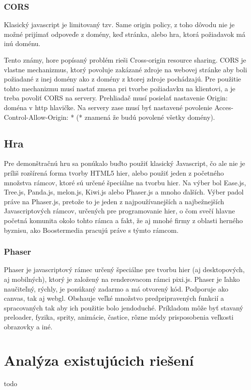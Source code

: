 \subsection{CORS}
\label{sec:cors}
Klasický javascript je limitovaný tzv. Same origin policy, z toho dôvodu nie je možné prijímať odpoveďe z domény, keď stránka, alebo hra, ktorá požiadavok má inú doménu. 

Tento známy, hore popísaný problém rieši Cross-origin resource sharing. CORS je vlastne mechanizmus, ktorý povoluje zakázané zdroje na webovej stránke aby boli požiadané z inej domény ako z domény z ktorej zdroje pochádzajú. Pre použitie tohto mechanizmu musí nastať zmena pri tvorbe požiadavku na klientovi, a je treba povoliť CORS na servery. Prehliadač musí posielať nastavenie Origin: doména v http hlavičke. Na servery zase musí byť nastavené povolenie Acces-Control-Allow-Origin: * (* znamená že budú povolené všetky domény).

\section{Hra}
\label{sec:hra}
Pre demonštračnú hru sa ponúkalo buďto použiť klasický Javascript, čo ale nie je príliš rozšírená forma tvorby HTML5 hier, alebo použiť jeden z početného množstva rámcov, ktoré sú určené špeciálne na tvorbu hier. Na výber bol Ease.js, Tree.js, Panda.js, melon.js, Kiwi.js alebo Phaser.js a mnoho ďalších. Výber padol práve na Phaser.js, pretože to je jeden z najpoužívanejších a najbežnejších Javascriptových rámcov, určených pre programovanie hier, o čom svečí hlavne početná komunita okolo tohto rámca a fakt, že aj mnohé firmy z oblasti herného byznisu, ako Boostermedia pracujú práve s týmto rámcom. 

\subsection{Phaser}
\label{sec:phaser}
Phaser je javascriptový rámec určený špeciálne pre tvorbu hier (aj desktopových, aj mobilných), ktorý je založený na renderovacom rámci pixi.js. Phaser je ľahko naučiteľný, rýchly, je ponúkaný zadarmo a má otvorený kód. Podporuje ako canvas, tak aj webgl. Obshauje veľké množstvo predpripravených funkcií a spracovaných tak aby ich použitie bolo jendoduché. Príkladom môže byť stavaný preloader, fyzika, sprity, animácie, častice, rôzne módy prisposobenia veľkosti obrazovky a iné. 

\chapter{Analýza existujúcich riešení}
\label{chap:analyza}
todo

